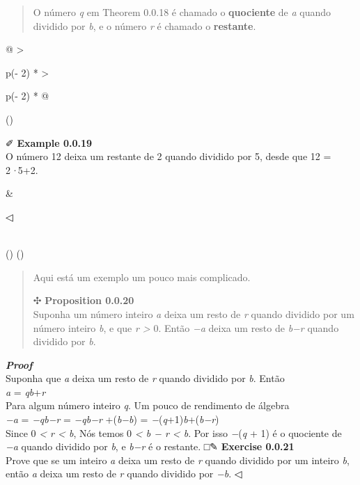 \documentclass[
]{article}
\begin{document}
\begin{quote}
O número \emph{q} em Theorem 0.0.18 é chamado o \textbf{quociente} de
\emph{a} quando dividido por \emph{b}, e o número \emph{r} é chamado o
\textbf{restante}.
\end{quote}

\begin{longtable}[]{@{}
  >{\raggedright\arraybackslash}p{(\columnwidth - 2\tabcolsep) * }
  >{\raggedright\arraybackslash}p{(\columnwidth - 2\tabcolsep) * }@{}}
\toprule()
\begin{minipage}[b]{\linewidth}\raggedright
✐ \textbf{Example 0.0.19}\\
O número 12 deixa um restante de 2 quando dividido por 5, desde que 12 =
2\emph{·}5+2.\strut
\end{minipage} & \begin{minipage}[b]{\linewidth}\raggedright
◁
\end{minipage} \\
\midrule()
\endhead
\bottomrule()
\end{longtable}

\begin{quote}
Aqui está um exemplo um pouco mais complicado.

✣ \textbf{Proposition 0.0.20}\\
Suponha um número inteiro \emph{a} deixa um resto de \emph{r} quando
dividido por um número inteiro \emph{b}, e que \emph{r \textgreater{}}
0. Então \emph{−a} deixa um resto de \emph{b−r} quando dividido por
\emph{b}.
\end{quote}

\emph{\textbf{Proof}}\\
Suponha que \emph{a} deixa um resto de \emph{r} quando dividido por
\emph{b}. Então\\
\emph{a} = \emph{qb}+\emph{r}\\
Para algum número inteiro \emph{q}. Um pouco de rendimento de álgebra\\
\emph{−a} = \emph{−qb−r} = \emph{−qb−r} +(\emph{b−b}) =
\emph{−}(\emph{q}+1)\emph{b}+(\emph{b−r})\\
Since 0 \emph{\textless{} r \textless{} b}, Nós temos 0
\emph{\textless{} b − r \textless{} b}. Por isso \emph{−}(\emph{q} + 1)
é o quociente de \emph{−a} quando dividido por \emph{b}, e \emph{b−r} é
o restante. □✎ \textbf{Exercise 0.0.21}\\
Prove que se um inteiro \emph{a} deixa um resto de \emph{r} quando
dividido por um inteiro \emph{b}, então \emph{a} deixa um resto de
\emph{r} quando dividido por \emph{−b}. ◁
\end{document}
